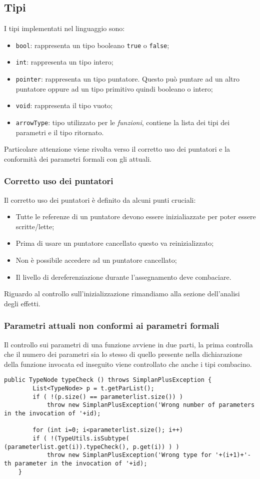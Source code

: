 \documentclass[../../main]{subfiles}
\begin{document}
\subsection{Tipi}
I tipi implementati nel linguaggio sono:
\begin{itemize}
    \item \verb|bool|: rappresenta un tipo booleano \verb|true| o \verb|false|;
    \item \verb|int|: rappresenta un tipo intero;
    \item \verb|pointer|: rappresenta un tipo puntatore. Questo può puntare ad un altro puntatore oppure ad un tipo primitivo quindi booleano o intero;
    \item \verb|void|: rappresenta il tipo vuoto;
    \item \verb|arrowType|: tipo utilizzato per le \textit{funzioni}, contiene la lista dei tipi dei parametri e il tipo ritornato.
\end{itemize}

Particolare attenzione viene rivolta verso il corretto uso dei puntatori e la conformità dei parametri formali con gli attuali.
\subsubsection{Corretto uso dei puntatori}
Il corretto uso dei puntatori è definito da alcuni punti cruciali:
\begin{itemize}
    \item Tutte le referenze di un puntatore devono essere inizialiazzate per poter essere scritte/lette;
    \item Prima di usare un puntatore cancellato questo va reinizializzato;
    \item Non è possibile accedere ad un puntatore cancellato;
    \item Il livello di dereferenziazione durante l'assegnamento deve combaciare.
\end{itemize}
Riguardo al controllo sull'inizializzazione rimandiamo alla sezione dell'analisi degli effetti.
\subsubsection{Parametri attuali non conformi ai parametri formali}
Il controllo sui parametri di una funzione avviene in due parti, la prima controlla che il numero dei parametri sia lo stesso di quello presente
nella dichiarazione della funzione invocata ed inseguito viene controllato che anche i tipi combacino.

\begin{lstlisting}[style=java]
    public TypeNode typeCheck () throws SimplanPlusException {  
        List<TypeNode> p = t.getParList();
        if ( !(p.size() == parameterlist.size()) )
            throw new SimplanPlusException('Wrong number of parameters in the invocation of '+id);
        
        for (int i=0; i<parameterlist.size(); i++)
        if ( !(TypeUtils.isSubtype( (parameterlist.get(i)).typeCheck(), p.get(i)) ) )
            throw new SimplanPlusException('Wrong type for '+(i+1)+'-th parameter in the invocation of '+id);
    }
       
\end{lstlisting}
\end{document}
